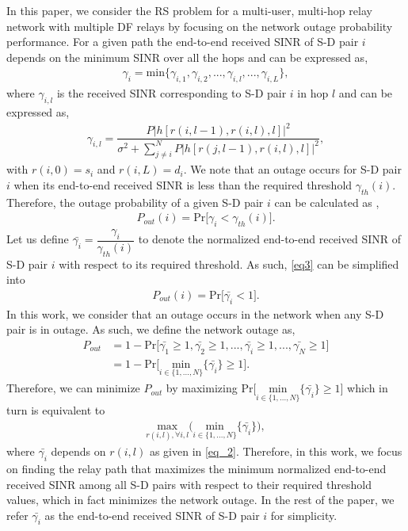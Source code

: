\documentclass[12pt,draftclsnofoot,onecolumn]{IEEEtran}
\begin{document}
	In this paper, we consider the RS problem for a multi-user, multi-hop relay network with multiple DF relays by focusing on the network outage probability performance. For a given path the end-to-end received SINR of S-D pair $i$ depends on the minimum SINR over all the hops and can be expressed as,
	\begin{align}\label{eq_1}
	\gamma_i = \textrm{min}\{\gamma_{i,1},\gamma_{i,2},...,\gamma_{i,l},...,\gamma_{i,L}\},
	\end{align}	
	where $\gamma_{i,l}$ is the received SINR corresponding to S-D pair $i$ in hop $l$ and can be expressed as,
	\begin{align}\label{eq_2}
		\gamma_{i,l} = 
		\dfrac{P|h[r(i,l-1),r(i,l),l]|^2}{\sigma^2+\sum_{j \neq i}^N P|h[r(j,l-1),r(i,l),l]|^2},
	\end{align} 
	with $r(i,0)=s_i$ and $r(i,L)=d_i$. We note that an outage occurs for S-D pair $i$ when its end-to-end received SINR is less than the required threshold $\gamma_{th}(i)$. Therefore, the outage probability of a given S-D pair $i$ can be calculated as \cite{5982498},
	\begin{align}\label{eq3}
	P_{out}(i) = \textrm{Pr}\bigg[\gamma_i < \gamma_{th}(i)\bigg].
	\end{align}
	Let us define $\bar{\gamma_i}=\dfrac{\gamma_i}{\gamma_{th}(i)}$ to denote the normalized end-to-end received SINR of S-D pair $i$ with respect to its required threshold. As such, \eqref{eq3} can be simplified into
	\begin{align}\label{eq4}
	P_{out}(i) = \textrm{Pr}\bigg[\bar{\gamma_i} < 1\bigg].
	\end{align}
	In this work, we consider that an outage occurs in the network when any S-D pair is in outage. As such, we define the network outage as,
	\begin{align}\label{eq5}
	P_{out} &= 1-\textrm{Pr}\bigg[\bar{\gamma_1} \ge 1,\bar{\gamma_2} \ge 1,...,\bar{\gamma_i} \ge 1,...,\bar{\gamma_N} \ge 1\bigg] \nonumber \\
	&= 1-\textrm{Pr}\bigg[{\underset{i \in \{1,...,N\}} {\textrm{min}}}\{\bar{\gamma_i}\} \ge 1\bigg].
	\end{align}
	Therefore, we can minimize $P_{out}$ by maximizing $\textrm{Pr}\bigg[{\underset{i \in \{1,...,N\}} {\textrm{min}}}\{\bar{\gamma_i}\}\ge 1\bigg]$ which in turn is equivalent to
	\begin{align}\label{eq6}
	{\underset{r(i,l), \forall i, l} {\textrm{max}}}\bigg({\underset{i \in \{1,...,N\}} {\textrm{min}}}\{\bar{\gamma_i}\}\bigg),
	\end{align}
	where $\bar{\gamma_i}$ depends on $r(i,l)$ as given in \eqref{eq_2}. Therefore, in this work, we focus on finding the relay path that maximizes the minimum normalized end-to-end received SINR among all S-D pairs with respect to their required threshold values, which in fact minimizes the network outage. In the rest of the paper, we refer $\bar{\gamma_i}$ as the end-to-end received SINR of S-D pair $i$ for simplicity.
	
\end{document}
